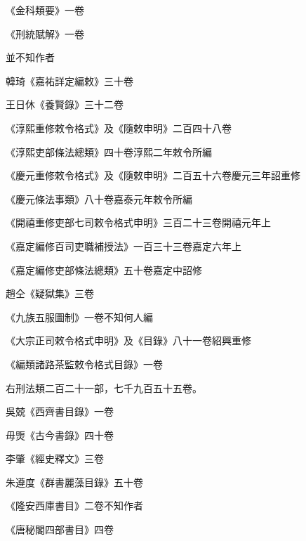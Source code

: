 \begin{pinyinscope}
 《金科類要》一卷



 《刑統賦解》一卷



 並不知作者



 韓琦《嘉祐詳定編敕》三十卷



 王日休《養賢錄》三十二卷



 《淳熙重修敕令格式》及《隨敕申明》二百四十八卷



 《淳熙吏部條法總類》四十卷淳熙二年敕令所編



 《慶元重修敕令格式》及《隨敕申明》二百五十六卷慶元三年詔重修



 《慶元條法事類》八十卷嘉泰元年敕令所編



 《開禧重修吏部七司敕令格式申明》三百二十三卷開禧元年上



 《嘉定編修百司吏職補授法》一百三十三卷嘉定六年上



 《嘉定編修吏部條法總類》五十卷嘉定中詔修



 趙仝《疑獄集》三卷



 《九族五服圖制》一卷不知何人編



 《大宗正司敕令格式申明》及《目錄》八十一卷紹興重修



 《編類諸路茶監敕令格式目錄》一卷



 右刑法類二百二十一部，七千九百五十五卷。



 吳兢《西齊書目錄》一卷



 毋煚《古今書錄》四十卷



 李肇《經史釋文》三卷



 朱遵度《群書麗藻目錄》五十卷



 《隆安西庫書目》二卷不知作者



 《唐秘閣四部書目》四卷




\end{pinyinscope}
